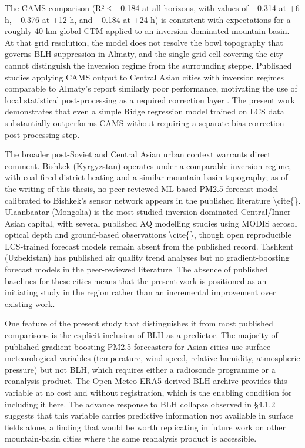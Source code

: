 The CAMS comparison (R² ≤ −0.184 at all horizons, with values of −0.314 at +6 h, −0.376 at +12 h, and −0.184 at +24 h) is consistent with expectations for a roughly 40 km global CTM applied to an inversion-dominated mountain basin. At that grid resolution, the model does not resolve the bowl topography that governs BLH suppression in Almaty, and the single grid cell covering the city cannot distinguish the inversion regime from the surrounding steppe. Published studies applying CAMS output to Central Asian cities with inversion regimes comparable to Almaty's report similarly poor performance, motivating the use of local statistical post-processing as a required correction layer \cite{inness2019cams, Wang2016CTM}. The present work demonstrates that even a simple Ridge regression model trained on LCS data substantially outperforms CAMS without requiring a separate bias-correction post-processing step.

The broader post-Soviet and Central Asian urban context warrants direct comment. Bishkek (Kyrgyzstan) operates under a comparable inversion regime, with coal-fired district heating and a similar mountain-basin topography; as of the writing of this thesis, no peer-reviewed ML-based PM2.5 forecast model calibrated to Bishkek's sensor network appears in the published literature \textbackslash cite\{\cite{Isaev2022}\}. Ulaanbaatar (Mongolia) is the most studied inversion-dominated Central/Inner Asian capital, with several published AQ modelling studies using MODIS aerosol optical depth and ground-based observations \textbackslash cite\{\cite{enebish2021ulaanbaatar}\}, though open reproducible LCS-trained forecast models remain absent from the published record. Tashkent (Uzbekistan) has published air quality trend analyses but no gradient-boosting forecast models in the peer-reviewed literature. The absence of published baselines for these cities means that the present work is positioned as an initiating study in the region rather than an incremental improvement over existing work.

One feature of the present study that distinguishes it from most published comparisons is the explicit inclusion of BLH as a predictor. The majority of published gradient-boosting PM2.5 forecasters for Asian cities use surface meteorological variables (temperature, wind speed, relative humidity, atmospheric pressure) but not BLH, which requires either a radiosonde programme or a reanalysis product. The Open-Meteo ERA5-derived BLH archive \cite{zippenfenig_openmeteo_2023} provides this variable at no cost and without registration, which is the enabling condition for including it here. The advance response to BLH collapse observed in §4.1.2 suggests that this variable carries predictive information not available in surface fields alone, a finding that would be worth replicating in future work on other mountain-basin cities where the same reanalysis product is accessible.

